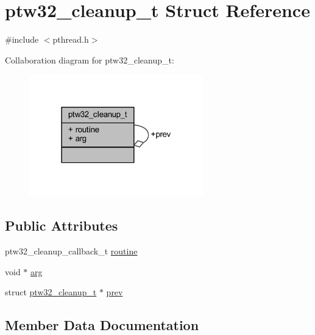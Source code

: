 \hypertarget{structptw32__cleanup__t}{}\section{ptw32\+\_\+cleanup\+\_\+t Struct Reference}
\label{structptw32__cleanup__t}


{\ttfamily \#include $<$pthread.\+h$>$}



Collaboration diagram for ptw32\+\_\+cleanup\+\_\+t\+:
\nopagebreak
\begin{figure}[H]
\begin{center}
\leavevmode
\includegraphics[width=214pt]{structptw32__cleanup__t__coll__graph}
\end{center}
\end{figure}
\subsection*{Public Attributes}
\begin{DoxyCompactItemize}
\item 
ptw32\+\_\+cleanup\+\_\+callback\+\_\+t \mbox{\hyperlink{structptw32__cleanup__t_ad197a94dcb95ce712f2d8f6c141a9aef}{routine}}
\item 
void $\ast$ \mbox{\hyperlink{structptw32__cleanup__t_a2a4e7cc43435bafabdbcdfa892da4d88}{arg}}
\item 
struct \mbox{\hyperlink{structptw32__cleanup__t}{ptw32\+\_\+cleanup\+\_\+t}} $\ast$ \mbox{\hyperlink{structptw32__cleanup__t_a01e8236d7e28e823b8277e81e9e03d03}{prev}}
\end{DoxyCompactItemize}


\subsection{Member Data Documentation}
\mbox{\label{structptw32__cleanup__t_a2a4e7cc43435bafabdbcdfa892da4d88}} 
